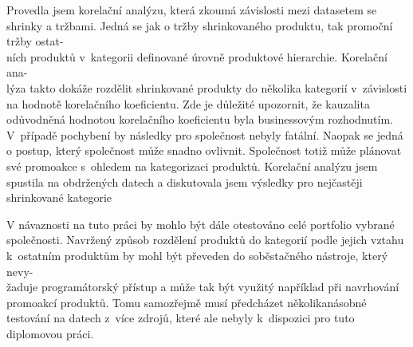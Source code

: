 Provedla jsem korelační analýzu, která zkoumá závislosti mezi datasetem se shrinky a tržbami. Jedná se jak o tržby shrinkovaného produktu, tak promoční tržby ostat-\\ních produktů v~kategorii definované úrovně produktové hierarchie. Korelační ana-\\lýza takto dokáže rozdělit shrinkované produkty do několika kategorií v~závislosti na hodnotě korelačního koeficientu. Zde je důležité upozornit, že kauzalita odůvodněná hodnotou korelačního koeficientu byla businessovým rozhodnutím. V~případě pochybení by následky pro společnost nebyly fatální. Naopak se jedná o postup, který společnost může snadno ovlivnit. Společnost totiž může plánovat své promoakce s~ohledem na kategorizaci produktů. 
Korelační analýzu jsem spustila na obdržených datech a diskutovala jsem výsledky pro nejčastěji shrinkované kategorie  

V návaznosti na tuto práci by mohlo být dále otestováno celé portfolio vybrané společnosti.
Navržený způsob rozdělení produktů do kategorií podle jejich vztahu k~ostatním produktům by mohl být převeden do soběstačného nástroje, který nevy-\\žaduje programátorský přístup a může tak být využitý například při navrhování promoakcí produktů. Tomu samozřejmě musí předcházet několikanásobné testování na datech z~více zdrojů, které ale nebyly k~dispozici pro tuto diplomovou práci.


